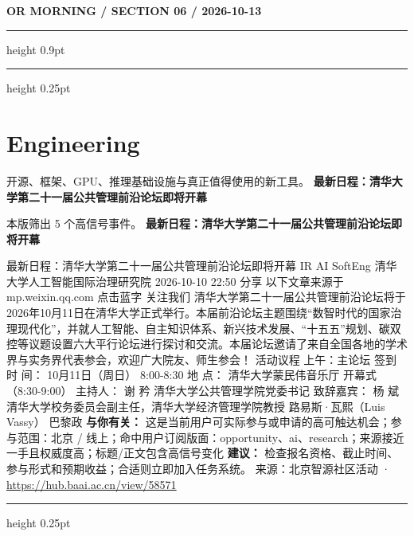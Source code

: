 \documentclass[10.5pt]{ctexart}
\begin{document}
\newpage
{\small\bfseries OR MORNING / SECTION 06 / 2026-10-13}
\vspace{2mm}
\hrule height 0.9pt
\vspace{1.5mm}
\hrule height 0.25pt
\vspace{4mm}
\section*{Engineering}
{\color{ormuted} 开源、框架、GPU、推理基础设施与真正值得使用的新工具。}
\vspace{2mm}
{\LARGE\bfseries 最新日程：清华大学第二十一届公共管理前沿论坛即将开幕}\par
\vspace{1mm}
{\color{ormuted} 本版筛出 5 个高信号事件。}
\vspace{3mm}
{\Large\bfseries 最新日程：清华大学第二十一届公共管理前沿论坛即将开幕}\par
最新日程：清华大学第二十一届公共管理前沿论坛即将开幕 IR AI SoftEng 清华大学人工智能国际治理研究院 2026-10-10 22:50 分享 以下文章来源于mp.weixin.qq.com 点击蓝字 关注我们 清华大学第二十一届公共管理前沿论坛将于2026年10月11日在清华大学正式举行。本届前沿论坛主题围绕“数智时代的国家治理现代化”，并就人工智能、自主知识体系、新兴技术发展、“十五五”规划、碳双控等议题设置六大平行论坛进行探讨和交流。本届论坛邀请了来自全国各地的学术界与实务界代表参会，欢迎广大院友、师生参会！ 活动议程 上午：主论坛 签到 时 间： 10月11日（周日） 8:00-8:30 地 点： 清华大学蒙民伟音乐厅 开幕式（8:30-9:00） 主持人： 谢 矜 清华大学公共管理学院党委书记 致辞嘉宾： 杨 斌 清华大学校务委员会副主任，清华大学经济管理学院教授 路易斯·瓦熙（Luis Vassy） 巴黎政
\textbf{与你有关：} 这是当前用户可实际参与或申请的高可触达机会；参与范围：北京 / 线上；命中用户订阅版面：opportunity、ai、research；来源接近一手且权威度高；标题/正文包含高信号变化
\textbf{建议：} 检查报名资格、截止时间、参与形式和预期收益；合适则立即加入任务系统。
{\footnotesize\color{ormuted} 来源：北京智源社区活动 · \url{https://hub.baai.ac.cn/view/58571}}
\vspace{4mm}
\hrule height 0.25pt
\vspace{3mm}
\end{document}
